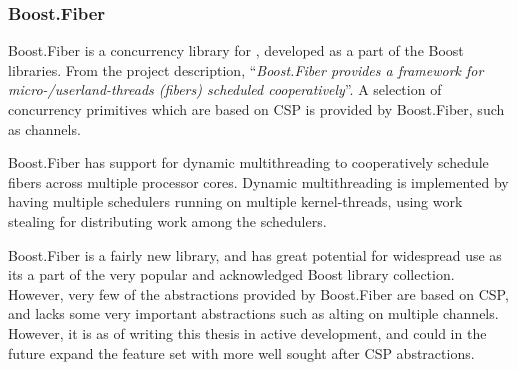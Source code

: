 \subsubsection{Boost.Fiber}


Boost.Fiber \citep{kowalke2017boost} is a concurrency library for \Cpp{}, developed as a part of the \Cpp{} Boost libraries. From the project description, ``\textit{Boost.Fiber provides a framework for micro-/userland-threads (fibers) scheduled cooperatively}''. A selection of concurrency primitives which are based on CSP is provided by Boost.Fiber, such as channels.

Boost.Fiber has support for dynamic multithreading to cooperatively schedule fibers across multiple processor cores. Dynamic multithreading is implemented by having multiple schedulers running on multiple kernel\hyp{}threads, using work stealing for distributing work among the schedulers.

Boost.Fiber is a fairly new library, and has great potential for widespread use as its a part of the very popular and acknowledged Boost library collection. However, very few of the abstractions provided by Boost.Fiber are based on CSP, and lacks some very important abstractions such as alting on multiple channels. However, it is as of writing this thesis in active development, and could in the future expand the feature set with more well sought after CSP abstractions. 
